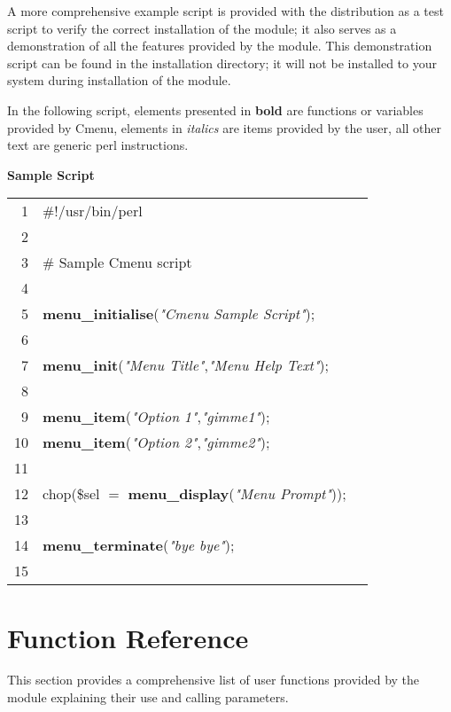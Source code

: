 \documentclass[a4paper]{scrartcl}
\begin{document}
A more comprehensive example script is provided with the distribution as a test script to verify the correct installation of the module; it also serves as a demonstration of all the features provided by the module. This demonstration script can be found in the installation directory; it will not be installed to your system during installation of the module.

In the following script, elements presented in \textbf{bold} are functions or variables provided by Cmenu, elements in \textit{italics} are items provided by the user, all other text are generic perl instructions.

\begin{center}
\textbf{Sample Script\\}
\begin{tabular}{rll}
\hline
1&\#!/usr/bin/perl\\
2&\\
3&\# Sample Cmenu script\\
4&\\
5&\textbf{menu\_initialise}(\textit{"Cmenu Sample Script"});\\
6&\\
7&\textbf{menu\_init}(\textit{"Menu Title"},\textit{"Menu Help Text"});\\
8&\\
9&\textbf{menu\_item}(\textit{"Option 1"},\textit{"gimme1"});\\
10&\textbf{menu\_item}(\textit{"Option 2"},\textit{"gimme2"});\\
11&\\
12&chop(\$sel $=$ \textbf{menu\_display}(\textit{"Menu Prompt"}));\\
13&\\
14&\textbf{menu\_terminate}(\textit{"bye bye"});\\
15&\\
\hline
\end{tabular}
\end{center}


\section{Function Reference}
This section provides a comprehensive list of user functions provided by the module explaining their use and calling parameters.
\end{document}
